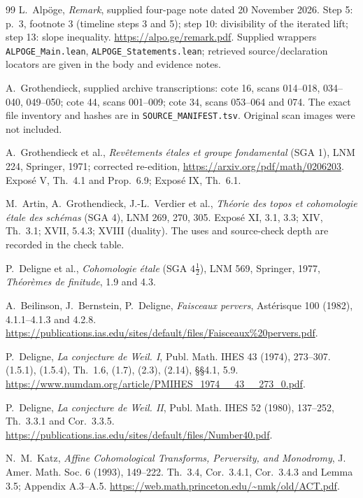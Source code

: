 \documentclass[11pt,a4paper]{article}
\theoremstyle{remark}
\begin{document}
\begin{thebibliography}{99}
L.~Alp\"oge, \emph{Remark}, supplied four-page note dated 20 November 2026.
Step 5: p.~3, footnote 3 (timeline steps 3 and 5); step 10: divisibility
of the iterated lift; step 13: slope inequality.
\url{https://alpo.ge/remark.pdf}. Supplied wrappers
\texttt{ALPOGE\_Main.lean}, \texttt{ALPOGE\_Statements.lean}; retrieved
source/declaration locators are given in the body and evidence notes.

A.~Grothendieck, supplied archive transcriptions: cote 16, scans 014--018,
034--040, 049--050; cote 44, scans 001--009; cote 34, scans 053--064 and
074. The exact file inventory and hashes are in \texttt{SOURCE\_MANIFEST.tsv}.
Original scan images were not included.

A.~Grothendieck et al., \emph{Rev\^etements \'etales et groupe fondamental}
(SGA 1), LNM 224, Springer, 1971; corrected re-edition,
\url{https://arxiv.org/pdf/math/0206203}.
Expos\'e V, Th.~4.1 and Prop.~6.9; Expos\'e IX, Th.~6.1.

M.~Artin, A.~Grothendieck, J.-L.~Verdier et al., \emph{Th\'eorie des topos
et cohomologie \'etale des sch\'emas} (SGA 4), LNM 269, 270, 305.
Expos\'e XI, 3.1, 3.3; XIV, Th.~3.1; XVII, 5.4.3; XVIII (duality).
The uses and source-check depth are recorded in the check table.

P.~Deligne et al., \emph{Cohomologie \'etale} (SGA $4\frac12$), LNM 569,
Springer, 1977, \emph{Th\'eor\`emes de finitude}, 1.9 and 4.3.

A.~Beilinson, J.~Bernstein, P.~Deligne, \emph{Faisceaux pervers},
Ast\'erisque 100 (1982), 4.1.1--4.1.3 and 4.2.8.
\url{https://publications.ias.edu/sites/default/files/Faisceaux%20pervers.pdf}.

P.~Deligne, \emph{La conjecture de Weil. I}, Publ. Math. IHES 43 (1974),
273--307. (1.5.1), (1.5.4), Th.~1.6, (1.7), (2.3), (2.14),
\S\S4.1, 5.9.
\url{https://www.numdam.org/article/PMIHES_1974__43__273_0.pdf}.

P.~Deligne, \emph{La conjecture de Weil. II}, Publ. Math. IHES 52 (1980),
137--252, Th.~3.3.1 and Cor.~3.3.5.
\url{https://publications.ias.edu/sites/default/files/Number40.pdf}.

N.~M.~Katz, \emph{Affine Cohomological Transforms, Perversity, and
Monodromy}, J. Amer. Math. Soc. 6 (1993), 149--222.
Th.~3.4, Cor.~3.4.1, Cor.~3.4.3 and Lemma 3.5; Appendix A.3--A.5.
\url{https://web.math.princeton.edu/~nmk/old/ACT.pdf}.


\end{thebibliography}
\end{document}
